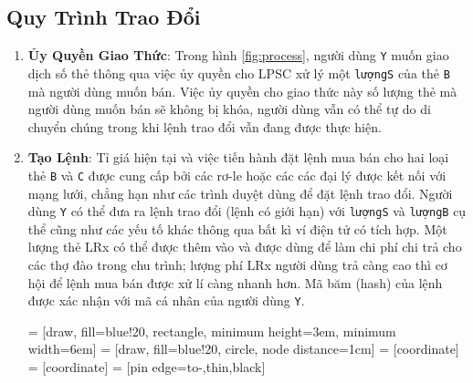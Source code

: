 \documentclass{article}
\makeatletter
\newenvironment{figurehere}
 {\def\@captype{figure}}
 {}
\makeatother
\begin{document}
\begin{multicols}{2}
\section{Quy Trình Trao Đổi\label{sec:process}}



\begin{enumerate} 


\item \textbf{Ủy Quyền Giao Thức}: Trong hình \ref{fig:process}, người dùng \verb|Y| muốn giao dịch số thẻ thông qua việc ủy quyền cho LPSC xử lý một \verb|lượngS| của thẻ \verb|B| mà người dùng muốn bán. Việc ủy quyền cho giao thức này số lượng thẻ mà người dùng muốn bán sẽ không bị khóa, người dùng vẫn có thể tự do di chuyển chúng trong khi lệnh trao đổi vẫn đang được thực hiện.

\item \textbf{Tạo Lệnh}: Tỉ giá hiện tại và việc tiến hành đặt lệnh mua bán cho hai loại thẻ \verb|B| và \verb|C| được cung cấp bởi các rơ-le hoặc các các đại lý được kết nối với mạng lưới, chẳng hạn như các trình duyệt dùng để đặt lệnh trao đổi. Người dùng \verb|Y| có thể đưa ra lệnh trao đổi (lệnh có giới hạn) với \verb|lượngS| và \verb|lượngB| cụ thể cũng như các yếu tố khác thông qua bất kì ví điện tử có tích hợp. Một lượng thẻ LRx có thể được thêm vào và được dùng để làm chi phí chi trả cho các thợ đào trong chu trình; lượng phí LRx người dùng trả càng cao thì cơ hội để lệnh mua bán được xử lí càng nhanh hơn. Mã băm (hash) của lệnh được xác nhận với mã cá nhân của người dùng \verb|Y|.

\begin{center}
\begin{figurehere}
\centering
{} = [draw, fill=blue!20, rectangle, 
    minimum height=3em, minimum width=6em]
 = [draw, fill=blue!20, circle, node distance=1cm]
 = [coordinate]
 = [coordinate]
 = [pin edge={to-,thin,black}]

\begin{tikzpicture}[
    auto, 
    scale=0.7,
    node distance=2cm,
    >=latex',
    font=\bfseries\footnotesize\sffamily,
    order/.style={
		rectangle,
		scale=0.7,
		rounded corners,
		draw=black, 
		text centered,
		minimum height=12mm,
		minimum width=30mm,
		fill=white
	},
	role/.style={
		circle,
		scale=0.7,
		draw=black, 
		text centered,
		minimum height=12mm,
		minimum width=12mm,
		fill=white
	},
	steps/.style={
		circle,
		scale=0.7,
		draw=black, 
		text centered,
		fill=black,
		text=white
	},
	account/.style={
		circle,
		scale=0.7,
		draw=black, 
		text centered,
		minimum height=16mm,
		minimum width=16mm,
		fill=white
	},
	label/.style={
	  scale=0.7
    }
  ]


\end{tikzpicture}
\end{figurehere}
\end{center}
\end{enumerate}
\end{multicols}
\end{document}
